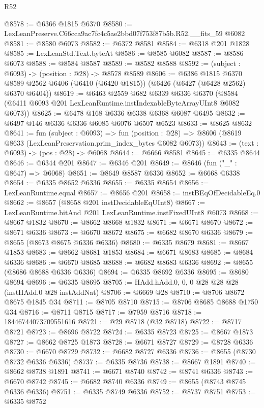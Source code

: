 \begin{lexlean}{R52}
\begin{coremodule}
@8578 := @6366 @1815 @6370
@8580 := LexLeanPreserve.C66cca9ac7fc4c5ae2bbd07f753f87b5b.R52.__fits_59 @6082
@8581 := @8580 @6073
@8582 := @6372 @8581
@8584 := @6318 @201 @1828
@8585 := LexLeanStd.Text.byteAt
@8586 := @8585 @6082
@8587 := @8586 @6073
@8588 := @8584 @8587
@8589 := @8582 @8588
@8592 := (subject : @6093) -> (position : @28) -> @8578 @8589
@8606 := @6386
    @1815
    @6370
    @8589
    @2562
    @6406
    (@6410 (@6420 @1815))
    (@6426 (@6427 (@6428 @2562) @6370 @6404))
@8619 := @6463
    @2559
    @682
    @6339
    @6336
    @6370
    (@8584 (@6411 @6093 @201 LexLeanRuntime.instIndexableByteArrayUInt8 @6082 @6073))
@8625 := @6478 @168 @6336 @6338 @6368 @6087 @6495
@8632 := @6497 @146 @6336 @6336 @6085 @6076 @6507 @6523
@8633 := @8625 @8632
@8641 := fun (subject : @6093) =>
  fun (position : @28) => @8606 (@8619 @8633 (LexLeanPreservation.prim_index_bytes @6082 @6073))
@8643 := (text : @6093) -> (pos : @28) -> @6068
@8644 := @6666 @8581
@8645 := @6335 @8644
@8646 := @6344 @201
@8647 := @6346 @201
@8649 := @8646 (fun ("_" : @8647) => @6068)
@8651 := @8649 @8587 @6336
@8652 := @6668 @6338
@8654 := @6335 @8652 @6336
@8655 := @6335 @8654
@8656 := LexLeanRuntime.equal
@8657 := @8656 @201
@8658 := instBEqOfDecidableEq.{0}
@8662 := @8657 (@8658 @201 instDecidableEqUInt8)
@8667 := LexLeanRuntime.bitAnd @201 LexLeanRuntime.instFixedUInt8 @6073
@8668 := @8667 @1832
@8670 := @8662 @8668 @1832
@8671 := @6671 @8670
@8672 := @8671 @6336
@8673 := @6670 @8672
@8675 := @6682 @8670 @6336
@8679 := @8655 (@8673 @8675 @6336 @6336)
@8680 := @6335 @8679
@8681 := @8667 @1853
@8683 := @8662 @8681 @1853
@8684 := @6671 @8683
@8685 := @8684 @6336
@8686 := @6670 @8685
@8688 := @6682 @8683 @6336
@8692 := @8655 (@8686 @8688 @6336 @6336)
@8694 := @6335 @8692 @6336
@8695 := @8680 @8694
@8696 := @6335 @8695
@8705 := HAdd.hAdd.{0, 0, 0} @28 @28 @28 (instHAdd.{0} @28 instAddNat)
@8706 := @6669 @28
@8710 := @8706 @8672 @8675 @1845 @34
@8711 := @8705 @8710
@8715 := @8706 @8685 @8688 @1750 @34
@8716 := @8711 @8715
@8717 := @7959 @8716
@8718 := 18446744073709551616
@8721 := @29 @8718 (@32 @8718)
@8722 := @8717 @8721
@8723 := @8696 @8722
@8724 := @6335 @8723
@8725 := @8667 @1873
@8727 := @8662 @8725 @1873
@8728 := @6671 @8727
@8729 := @8728 @6336
@8730 := @6670 @8729
@8732 := @6682 @8727 @6336
@8736 := @8655 (@8730 @8732 @6336 @6336)
@8737 := @6335 @8736
@8738 := @8667 @1891
@8740 := @8662 @8738 @1891
@8741 := @6671 @8740
@8742 := @8741 @6336
@8743 := @6670 @8742
@8745 := @6682 @8740 @6336
@8749 := @8655 (@8743 @8745 @6336 @6336)
@8751 := @6335 @8749 @6336
@8752 := @8737 @8751
@8753 := @6335 @8752

\end{coremodule}
\end{lexlean}

